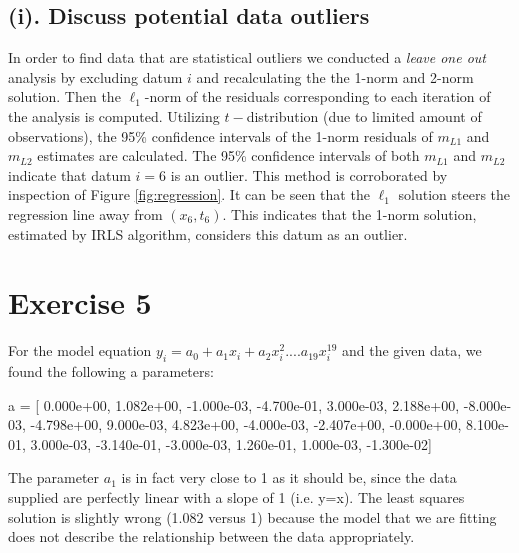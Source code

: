 \documentclass{article}
\begin{document}
\subsection*{(i). Discuss potential data outliers}
In order to find data that are statistical outliers we conducted a \textit{leave one out} analysis by excluding datum $i$ and recalculating the the 1-norm and 2-norm solution. Then the $\ell_1$-norm of the residuals corresponding to each iteration of the analysis is computed. Utilizing $t-$distribution (due to limited amount of observations), the 95\% confidence intervals of the 1-norm residuals of ${m_{L1}}$ and ${m_{L2}}$ estimates are calculated. The 95\% confidence intervals of both ${m_{L1}}$ and ${m_{L2}}$ indicate that datum $i=6$ is an outlier. This method is corroborated by inspection of Figure \ref{fig:regression}. It can be seen that the $\ell_1$ solution steers the regression line away from $(x_6,t_6)$. This indicates that the 1-norm solution, estimated by IRLS algorithm, considers this datum as an outlier.

\newpage
\section*{Exercise 5}
For the model equation $y_i = a_0 + a_1x_i + a_2x_i^2 .... a_{19}x_i^{19}$ and the given data, we found the following a parameters:

\begin{center}
a = [ 0.000e+00,  1.082e+00, -1.000e-03, -4.700e-01,  3.000e-03,
    2.188e+00, -8.000e-03, -4.798e+00,  9.000e-03,  4.823e+00,
    -4.000e-03, -2.407e+00, -0.000e+00,  8.100e-01,  3.000e-03,
    -3.140e-01, -3.000e-03,  1.260e-01,  1.000e-03, -1.300e-02]
\end{center}

The parameter $a_1$ is in fact very close to 1 as it should be, since the data supplied are perfectly linear with a slope of 1 (i.e. y=x). The least squares solution is slightly wrong (1.082 versus 1) because the model that we are fitting does not describe the relationship between the data appropriately. 
\end{document}
